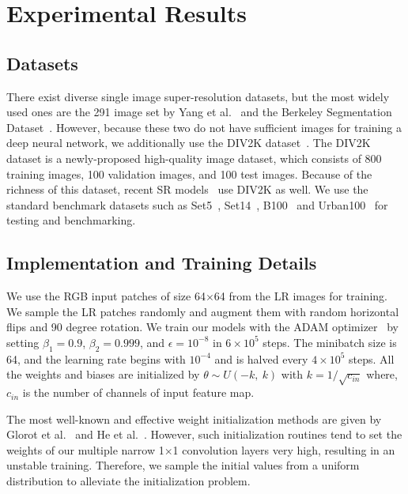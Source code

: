 \documentclass[runningheads]{llncs}
\begin{document}
\section{Experimental Results}
\label{sec:experiments}

\subsection{Datasets}
\label{subsec:dataset}
There exist diverse single image super-resolution datasets, but the most widely used ones are the 291 image set by Yang et al.~\cite{yang2010} and the Berkeley Segmentation Dataset~\cite{bsd2011}. However, because these two do not have sufficient images for training a deep neural network, we additionally use the DIV2K dataset~\cite{div2k}. The DIV2K dataset is a newly-proposed high-quality image dataset, which consists of 800 training images, 100 validation images, and 100 test images. Because of the richness of this dataset, recent SR models~\cite{mdsr2017,btsrn2017,cnf2017,selnet} use DIV2K as well. We use the standard benchmark datasets such as Set5~\cite{set5}, Set14~\cite{yang2010}, B100~\cite{b100} and Urban100~\cite{urban100} for testing and benchmarking.

\subsection{Implementation and Training Details}
\label{subsec:implementation}
We use the RGB input patches of size 64$\times$64 from the LR images for training. We sample the LR patches randomly and augment them with random horizontal flips and 90 degree rotation. We train our models with the ADAM optimizer~\cite{adam} by setting $\beta_{1} = 0.9$, $\beta_{2} = 0.999$, and $\epsilon = 10^{-8}$ in $6 \times 10^5$ steps. The minibatch size is 64, and the learning rate begins with $10^{-4}$ and is halved every $4 \times 10^5$ steps. All the weights and biases are initialized by $\theta \sim U(-k,\ k)$ with $k = 1/\sqrt{c_{in}}$ where, $c_{in}$ is the number of channels of input feature map.

The most well-known and effective weight initialization methods are given by Glorot et al.~\cite{glorot2010} and He et al.~\cite{he2015delving}. However, such initialization routines tend to set the weights of our multiple narrow 1$\times$1 convolution layers very high, resulting in an unstable training. Therefore, we sample the initial values from a uniform distribution to alleviate the initialization problem.
\end{document}
